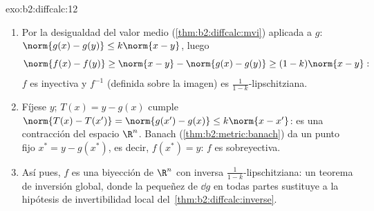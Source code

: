 \begin{solution}{exo:b2:diffcalc:12}
\begin{enumerate}
  \item Por la desigualdad del valor medio
        (\cref{thm:b2:diffcalc:mvi}) aplicada a $g$: $\norm{g(x) -
        g(y)} \leq k\norm{x-y}$, luego
        \[
        \norm{f(x) - f(y)} \geq \norm{x - y} - \norm{g(x) -
        g(y)} \geq (1 - k)\norm{x - y} :
        \]
        $f$ es inyectiva y $f^{-1}$ (definida sobre la imagen) es
        $\frac{1}{1-k}$-lipschitziana.
  \item Fíjese $y$; $T(x) = y - g(x)$ cumple $\norm{T(x) - T(x')} =
        \norm{g(x') - g(x)} \leq k\norm{x - x'}$: es una contracción
        del espacio  $\R^n$. Banach
        (\cref{thm:b2:metric:banach}) da un punto fijo $x^* = y -
        g(x^*)$, es decir, $f(x^*) = y$: $f$ es sobreyectiva.
  \item Así pues, $f$ es una biyección de $\R^n$ con inversa
        $\frac{1}{1-k}$-lipschitziana: un teorema de inversión
        global, donde la pequeñez de $\dd g$ en todas partes
        sustituye a la hipótesis de invertibilidad local del~\cref{thm:b2:diffcalc:inverse}.
\end{enumerate}
\end{solution}

